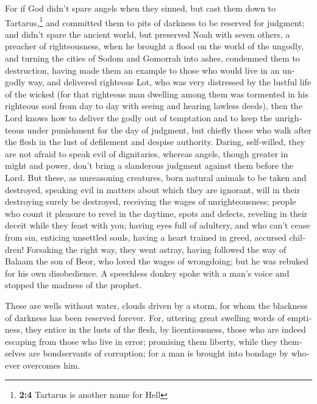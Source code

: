 \begin{paracol}{2}
\begin{otherlanguage}{english}
 For if God didn't spare angels when they sinned, but cast
them down to Tartarus,\footnote{\textbf{2:4} Tartarus is another name
  for Hell} and committed them to pits of darkness to be reserved for
judgment;  and didn't spare the ancient world, but
preserved Noah with seven others, a preacher of righteousness, when he
brought a flood on the world of the ungodly,  and turning
the cities of Sodom and Gomorrah into ashes, condemned them to
destruction, having made them an example to those who would live in an
ungodly way,  and delivered righteous Lot, who was very
distressed by the lustful life of the wicked  (for that
righteous man dwelling among them was tormented in his righteous soul
from day to day with seeing and hearing lawless deeds), 
then the Lord knows how to deliver the godly out of temptation and to
keep the unrighteous under punishment for the day of judgment,
 but chiefly those who walk after the flesh in the lust
of defilement and despise authority. Daring, self-willed, they are not
afraid to speak evil of dignitaries,  whereas angels,
though greater in might and power, don't bring a slanderous judgment
against them before the Lord.  But these, as unreasoning
creatures, born natural animals to be taken and destroyed, speaking evil
in matters about which they are ignorant, will in their destroying
surely be destroyed,  receiving the wages of
unrighteousness; people who count it pleasure to revel in the daytime,
spots and defects, reveling in their deceit while they feast with you;
 having eyes full of adultery, and who can't cease from
sin, enticing unsettled souls, having a heart trained in greed, accursed
children!  Forsaking the right way, they went astray,
having followed the way of Balaam the son of Beor, who loved the wages
of wrongdoing;  but he was rebuked for his own
disobedience. A speechless donkey spoke with a man's voice and stopped
the madness of the prophet.

 These are wells without water, clouds driven by a storm,
for whom the blackness of darkness has been reserved forever.
 For, uttering great swelling words of emptiness, they
entice in the lusts of the flesh, by licentiousness, those who are
indeed escaping from those who live in error;  promising
them liberty, while they themselves are bondservants of corruption; for
a man is brought into bondage by whoever overcomes him.


\end{otherlanguage}
\end{paracol}

